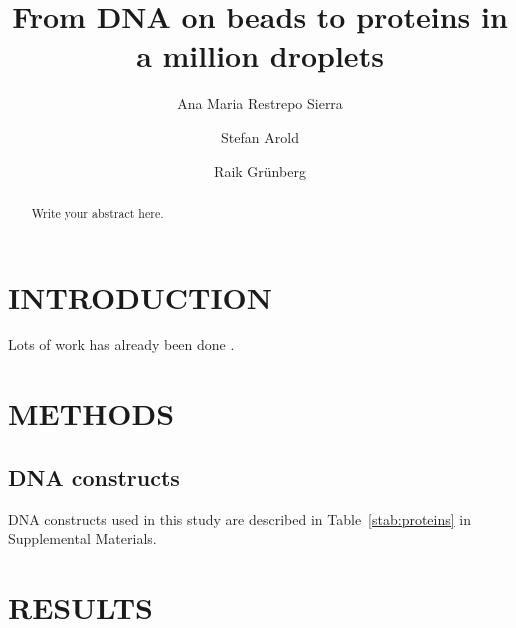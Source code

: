 \documentclass[10pt]{article}
\begin{document}
\title{From DNA on beads to proteins in a million droplets}

\author[1,2]{Ana Maria Restrepo Sierra}
\author[1]{Stefan Arold}
\author[1]{Raik Gr\"unberg}

\date{}                %

\maketitle
{} %
\newpage


\begin{abstract}
Write your abstract here.
\end{abstract}


\section*{INTRODUCTION}

Lots of work has already been done \cite{Buchner1897}. 

\section*{METHODS}

\subsection*{DNA constructs}
DNA constructs used in this study are described in Table~\ref{stab:proteins} in Supplemental Materials. 


\section*{RESULTS}
\end{document}
